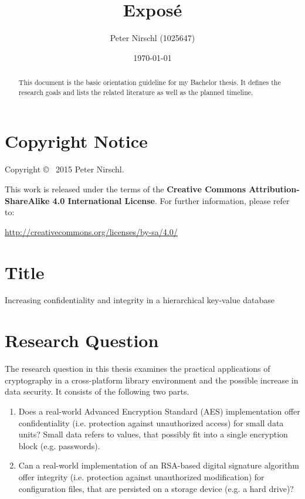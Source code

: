 \documentclass[a4paper]{article}
\title{Exposé}
\author{Peter Nirschl (1025647)}
\date{\today} %
\begin{document}
\maketitle
\begin{abstract}
This document is the basic orientation guideline for my Bachelor thesis.
It defines the research goals and lists the related literature as well as the planned timeline.
\end{abstract}

\vfill

\section*{Copyright Notice}

Copyright \copyright~ 2015 Peter Nirschl.

This work is released under the terms of the \textbf{Creative Commons Attribution-ShareAlike 4.0 International License}.
For further information, please refer to:

\url{http://creativecommons.org/licenses/by-sa/4.0/}

\newpage

\section{Title}

Increasing confidentiality and integrity in a hierarchical key-value database


\section{Research Question}

The research question in this thesis examines the practical applications of cryptography in a cross-platform library environment and the possible increase in data security.
It consists of the following two parts.

\begin{enumerate}
\item Does a real-world Advanced Encryption Standard (AES) implementation offer confidentiality (i.e. protection against unauthorized access) for small data units?
Small data refers to values, that possibly fit into a single encryption block (e.g. passwords).
      
\item Can a real-world implementation of an RSA-based digital signature algorithm offer integrity (i.e. protection against unauthorized modification) for configuration files, that are persisted on a storage device (e.g. a hard drive)?

\end{enumerate}
\end{document}
